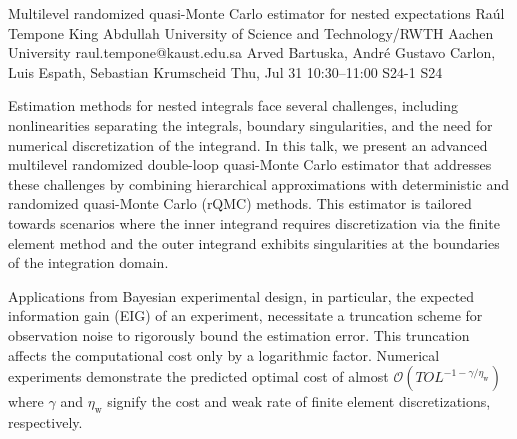 \begin{talk}
  {Multilevel randomized quasi-Monte Carlo estimator for nested expectations}%
  {Ra\'{u}l Tempone}%
  {King Abdullah University of Science and Technology/RWTH Aachen University}%
  {raul.tempone@kaust.edu.sa}%
  {Arved Bartuska, Andr\'{e} Gustavo Carlon, Luis Espath, Sebastian Krumscheid}%
  {}%
  {Thu, Jul 31 10:30–11:00}%
  {S24-1}%
  {S24}%
  
				
			
Estimation methods for nested integrals face several challenges, including nonlinearities separating the integrals, boundary singularities, and the need for numerical discretization of the integrand. In this talk, we present an advanced multilevel randomized double-loop quasi-Monte Carlo estimator that addresses these challenges by combining hierarchical approximations with deterministic and randomized quasi-Monte Carlo (rQMC) methods. This estimator is tailored towards scenarios where the inner integrand requires discretization via the finite element method and the outer integrand exhibits singularities at the boundaries of the integration domain. 

Applications from Bayesian experimental design, in particular, the expected information gain (EIG) of an experiment, necessitate a truncation scheme for observation noise to rigorously bound the estimation error. This truncation affects the computational cost only by a logarithmic factor. Numerical experiments demonstrate the predicted optimal cost of almost $\mathcal{O}(TOL^{-1-\gamma/\eta_{\text{w}}})$ where $\gamma$ and $\eta_{\text{w}}$ signify the cost and weak rate of finite element discretizations, respectively.

\end{talk}

